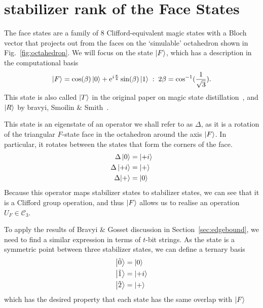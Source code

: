 \documentclass{standalone}
\begin{document}
\section{stabilizer rank of the Face States}\label{sec:frank}
The face states are a family of $8$ Clifford-equivalent magic states with a Bloch vector that projects out from the faces on the `simulable' octahedron shown in Fig.~\ref{fig:octahedron}. We will focus on the state $\ket{F}$, which has a description in the computational basis~\cite{Bravyi2005}
\begin{equation}\label{eq:Fstate}
\ket{F} = \cos(\beta)\ket{0}+\mathrm{e}^{i\frac{\pi}{4}}\sin(\beta)\ket{1}\;:\;2\beta = \cos^{-1}(\frac{1}{\sqrt{3}}).
\end{equation}
This state is also called $\ket{T}$ in the original paper on magic state distillation~\cite{Bravyi2005}, and $\ket{R}$ by bravyi, Smoilin \& Smith~\cite{Bravyi2015}.
\par
This state is an eigenstate of an operator we shall refer to as $\Delta$, as it is a rotation of the triangular $F$-state face in the octahedron around the axis $\ket{F}$. In particular, it rotates between the states that form the corners of the face.
\begin{align}
\begin{split}
    \Delta\ket{0} &= \ket{+i}\\
    \Delta\ket{+i} &= \ket{+} \\
    \Delta{\ket{+}} &= \ket{0} \\
\end{split}
\end{align}
Because this operator maps stabilizer states to stabilizer states, we can see that it is a Clifford group operation, and thus $\ket{F}$ allows us to realise an operation $U_{F}\in\mathcal{C}_{3}$.
\par
To apply the results of Bravyi \& Gosset discussion in Section~\ref{sec:edgebound}, we need to find a similar expression in terms of $t$-bit strings. As the state is a symmetric point between three stabilizer states, we can define a ternary basis
\begin{align}
\begin{split}
\ket{\tilde{0}} &= \ket{0}\\
\ket{\tilde{1}} &= \ket{+i}\\
\ket{\tilde{2}} &= \ket{+}\\
\end{split}
\end{align}
which has the desired property that each state has the same overlap with $\ket{F}$
\end{document}
